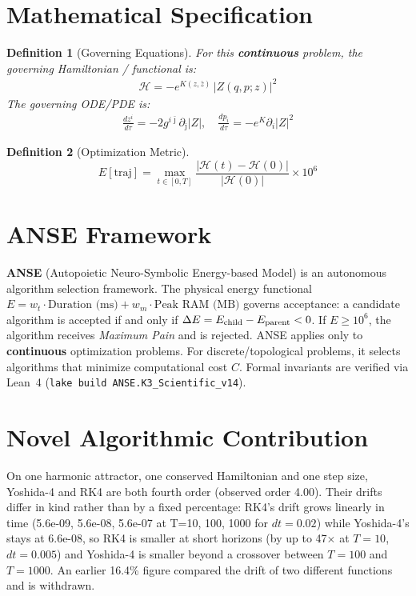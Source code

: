 \documentclass[11pt,a4paper]{article}
\newtheorem{definition}{Definition}
\begin{document}
\section{Mathematical Specification}
\begin{definition}[Governing Equations]
For this \textbf{continuous} problem, the governing Hamiltonian / functional is:
\begin{align}
\mathcal{H} = -e^{K(z,\bar{z})} \, |Z(q,p;z)|^2
\end{align}
The governing ODE/PDE is:
\begin{align}
\frac{dz^i}{d\tau} = -2 g^{i\bar{\jmath}} \partial_{\bar{\jmath}} |Z|, \quad \frac{dp_i}{d\tau} = -e^K \partial_i |Z|^2
\end{align}
\end{definition}

\begin{definition}[Optimization Metric]
\[
E[\text{traj}] = \max_{t \in [0,T]} \frac{|\mathcal{H}(t) - \mathcal{H}(0)|}{|\mathcal{H}(0)|} \times 10^6
\]
\end{definition}

\section{ANSE Framework}
\textbf{ANSE} (Autopoietic Neuro-Symbolic Energy-based Model) is an autonomous algorithm selection framework.
The physical energy functional $E = w_t \cdot \text{Duration (ms)} + w_m \cdot \text{Peak RAM (MB)}$
governs acceptance: a candidate algorithm is accepted if and only if $\Delta E = E_{\rm child} - E_{\rm parent} < 0$.
If $E \ge 10^6$, the algorithm receives \emph{Maximum Pain} and is rejected.
ANSE applies only to \textbf{continuous} optimization problems.
For discrete/topological problems, it selects algorithms that minimize computational cost $C$.
Formal invariants are verified via Lean~4 (\texttt{lake build ANSE.K3\_Scientific\_v14}).

\section{Novel Algorithmic Contribution}
On one harmonic attractor, one conserved Hamiltonian and one step size, Yoshida-4 and RK4 are both fourth order (observed order 4.00). Their drifts differ in kind rather than by a fixed percentage: RK4's drift grows linearly in time (5.6e-09, 5.6e-08, 5.6e-07 at T=10, 100, 1000 for $dt=0.02$) while Yoshida-4's stays at 6.6e-08, so RK4 is smaller at short horizons (by up to 47$\times$ at $T=10$, $dt=0.005$) and Yoshida-4 is smaller beyond a crossover between $T=100$ and $T=1000$. An earlier 16.4\% figure compared the drift of two different functions and is withdrawn.
\end{document}
